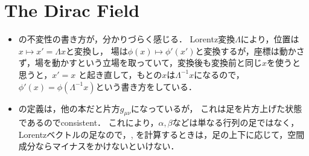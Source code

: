 \section{The Dirac Field}
\begin{itemize}
	\item {}の不変性の書き方が，分かりづらく感じる．
		Lorentz変換$\Lambda$により，位置は$x\mapsto x'= \Lambda x$と変換し，
		場は$\phi(x) \mapsto \phi'(x')$と変換するが，座標は動かさず，場を動かすという立場を取っていて，変換後も変換前と同じ$x$を使うと思うと，$x' = x$
		と起き直して，もとの$x$は$\Lambda^{-1}x$になるので，$\phi'(x)=\phi(\Lambda^{-1}x)$という書き方をしている．
	\item {}の定義は，他の本だと片方$g_{\mu\nu}$になっているが，
		これは足を片方上げた状態であるのでconsistent．
		これにより，$\alpha, \beta$などは単なる行列の足ではなく，
		Lorentzベクトルの足なので，, を計算するときは，足の上下に応じて，空間成分ならマイナスをかけないといけない．
\end{itemize}
